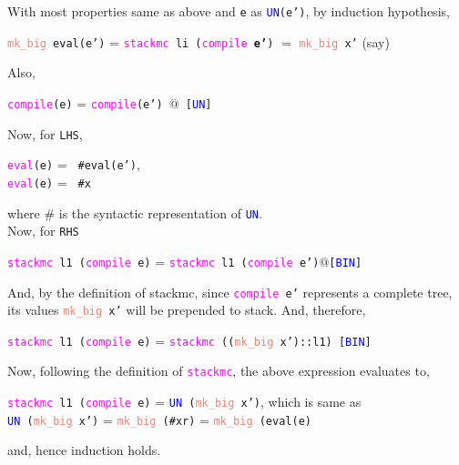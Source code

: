 \documentclass{article}
\begin{document}
With most properties same as above and \texttt{e} as \texttt{\textcolor{blue}{UN}(e')}, by induction hypothesis,
\begin{center}
    \texttt{\textcolor{Salmon}{mk\_big} eval(e')} =  \texttt{\textcolor{Fuchsia}{stackmc} li (\textcolor{Fuchsia}{compile} \textbf{e'})} \(=\) \texttt{\textcolor{Salmon}{mk\_big} x'} (say)
\end{center}
Also,
    \begin{center}
        \texttt{\textcolor{Fuchsia}{compile}(e)} = \texttt{\textcolor{Fuchsia}{compile}(e') $@$ [\textcolor{blue}{UN}]}
    \end{center}
    Now, for \texttt{LHS},
    \begin{center}
        \texttt{\textcolor{Fuchsia}{eval}(e)} = \texttt{ \#eval(e')},\\[5pt]
        \texttt{\textcolor{Fuchsia}{eval}(e)} = \texttt{ \#x}
    \end{center}
    where \# is the syntactic representation of \texttt{\textcolor{blue}{UN}}. \\[5pt]
    Now, for \texttt{RHS}
    \begin{center}
        {\small \texttt{\textcolor{Fuchsia}{stackmc} l1 (\textcolor{Fuchsia}{compile} e)} = \texttt{\textcolor{Fuchsia}{stackmc} l1 (\textcolor{Fuchsia}{compile} e')$@$[\textcolor{blue}{BIN}]}}
    \end{center}
    And, by the definition of stackmc, since \texttt{\textcolor{Fuchsia}{compile} e'} represents a complete tree, its values \texttt{\textcolor{Salmon}{mk\_big} x'} will be prepended to stack. And, therefore,
    \begin{center}
        {\small \texttt{\textcolor{Fuchsia}{stackmc} l1 (\textcolor{Fuchsia}{compile} e)} = \texttt{\textcolor{Fuchsia}{stackmc} ((\textcolor{Salmon}{mk\_big} x')::l1) [\textcolor{blue}{BIN}]}}
    \end{center}
    Now, following the definition of \texttt{\textcolor{Fuchsia}{stackmc}}, the above expression evaluates to,
    \begin{center}
        {\texttt{\textcolor{Fuchsia}{stackmc} l1 (\textcolor{Fuchsia}{compile} e)} = \texttt{\textcolor{blue}{UN} (\textcolor{Salmon}{mk\_big} x')}}, {\tiny which is same as} \\[5pt]
        {\small \texttt{\textcolor{blue}{UN} (\textcolor{Salmon}{mk\_big} x')} = \texttt{\textcolor{Salmon}{mk\_big} (\#xr)} = \texttt{\textcolor{Salmon}{mk\_big} (eval(e)}}
    \end{center}
    and, hence induction holds. \\
\end{document}
